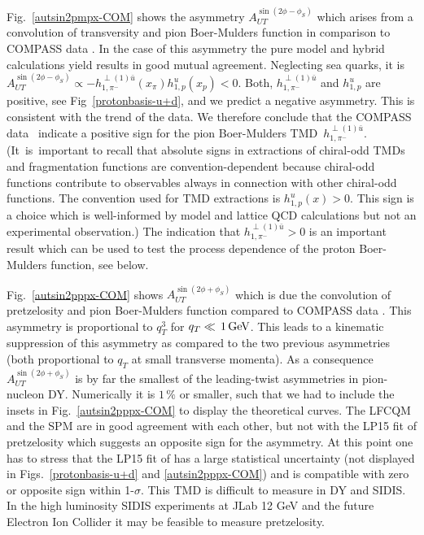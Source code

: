 \documentclass[a4paper]{article}
\begin{document}
Fig.~\ref{autsin2pmpx-COM} shows the asymmetry 
$A_{UT}^{\sin(2\phi-\phi_S)}$ which arises from a convolution
of transversity and pion Boer-Mulders function in comparison
to COMPASS data \cite{Aghasyan:2017jop}. 
In the case of this asymmetry the pure model and hybrid 
calculations yield results in good mutual agreement. 
Neglecting sea quarks, it is
$A_{UT}^{\sin(2\phi-\phi_S)}\propto - h_{1, \pi^-}^{\perp (1)\bar u }(x_\pi) h_{1,p}^u (x_p)<0$. 
Both, $h_{1, \pi^-}^{\perp (1)\bar u }$ and $h_{1,p}^u$ are positive, see Fig~\ref{protonbasis-u+d}, and we predict a 
negative asymmetry. This is consistent with the trend of the data.
We therefore conclude that the COMPASS data~\cite{Aghasyan:2017jop}
indicate a positive sign for the pion Boer-Mulders 
TMD~$h_{1, \pi^-}^{\perp (1)\bar u }$.
(It~is~important to recall that absolute signs in extractions
of chiral-odd TMDs and fragmentation functions are convention-dependent
because chiral-odd functions contribute to observables always in
connection with other chiral-odd functions. The convention used 
for TMD extractions is $h_{1,p}^u(x)>0$. This sign is a choice 
which is well-informed by model and lattice QCD calculations
but not an experimental observation.)
The indication that $h_{1, \pi^-}^{\perp (1)\bar u }>0$ is
an important result which can be used to test the process dependence
of the proton Boer-Mulders function, see below.

Fig.~\ref{autsin2pppx-COM} shows  
$A_{UT}^{\sin(2\phi+\phi_S)}$ which is due the convolution
of pretzelosity and pion Boer-Mulders function compared to  COMPASS
data \cite{Aghasyan:2017jop}. This asymmetry is proportional to
$q_T^3$ for $q_T\ll \,{1\,\rm GeV}$. This leads to a kinematic
suppression of this asymmetry as compared to the two previous 
asymmetries (both proportional to $q_T$ at small transverse momenta). 
As a consequence $A_{UT}^{\sin(2\phi+\phi_S)}$ is by far the 
smallest of the leading-twist asymmetries in pion-nucleon DY. 
Numerically it is $1\,\%$ or smaller, such that we had to include the
insets in Fig.~\ref{autsin2pppx-COM} to display the theoretical curves.
The LFCQM and the SPM are in good agreement with each other, 
but not with the LP15 fit of pretzelosity \cite{Lefky:2014eia} which
suggests an opposite sign for the asymmetry.
At this point one has
to stress that the LP15 fit of \cite{Lefky:2014eia} has a large 
statistical uncertainty (not displayed in Figs.~\ref{protonbasis-u+d} 
and \ref{autsin2pppx-COM}) and is compatible with zero or opposite sign
within 1-$\sigma$. This TMD is difficult to measure in DY and SIDIS.
In the high luminosity SIDIS experiments at JLab 12 GeV and the 
future Electron Ion Collider it may be feasible to measure pretzelosity. 
\end{document}
